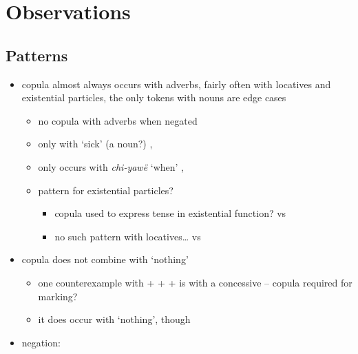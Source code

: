 \documentclass{memoir}
\begin{document}
\section{Observations}

\subsection{Patterns}

\begin{itemize}
\tightlist
\item
  copula almost always occurs with adverbs, fairly often with locatives
  and existential particles, the only tokens with nouns are edge cases

  \begin{itemize}
  \tightlist
  \item
    no copula with adverbs when negated
  \item
      only with `sick' (a noun?)
    , 
  \item
       only occurs with
    \emph{chi-yawë} `when' ,
  \item
    pattern for existential particles?

    \begin{itemize}
    \tightlist
    \item
      copula used to express tense in existential function?
       vs 
    \item
      no such pattern with locatives\ldots{}
       vs 
    \end{itemize}
  \end{itemize}
\item
  copula does not combine with  `nothing'

  \begin{itemize}
  \tightlist
  \item
    one counterexample with  +  + 
    +  is with a concessive
     -- copula required for
    marking?
  \item
    it does occur with  `nothing', though
  \end{itemize}
\item
  negation:


\end{itemize}
\end{document}
